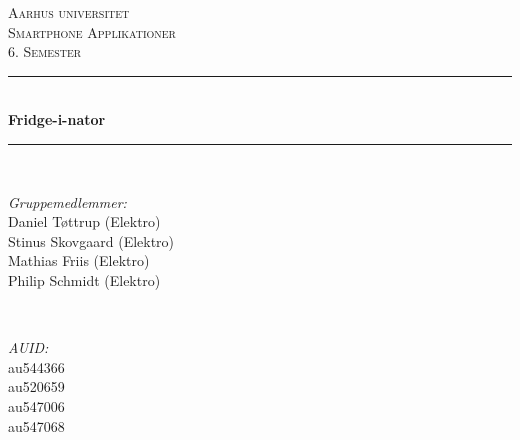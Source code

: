\documentclass[12pt]{article}
\begin{document}
	
	\begin{titlepage}
		
		
		
		\newcommand{\HRule}{\rule{\linewidth}{0.5mm}} %
		\setlength{\topmargin}{0in}
		\centering %
		
		\textsc{\LARGE Aarhus universitet}\\[1.5cm] %
		\textsc{\Large Smartphone Applikationer}\\[0.5cm] %
		\textsc{\large 6. Semester}\\[0.5cm] %
		
		
		\HRule \\[0.4cm]
		{ \huge \bfseries Fridge-i-nator}\\ %
		\HRule \\[1cm]
		
		
		\begin{minipage}{0.4\textwidth}
			\begin{flushleft} \large
				\emph{Gruppemedlemmer:}\\
				Daniel Tøttrup (Elektro) \\
				Stinus Skovgaard (Elektro) \\
				Mathias Friis (Elektro) \\
				Philip Schmidt (Elektro) \\
			\end{flushleft}
		\end{minipage}
		~
		\begin{minipage}{0.4\textwidth}
			\begin{flushright} \large
				\emph{AUID:} \\
				au544366\\
				au520659\\
				au547006 \\
				au547068 \\
			\end{flushright}
		\end{minipage}\\[5cm]
		

\end{titlepage}
\end{document}
